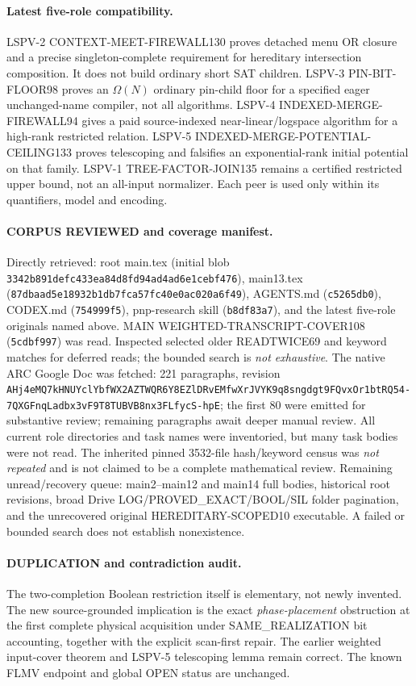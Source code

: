 \documentclass[11pt]{article}
\begin{document}
\paragraph{Latest five-role compatibility.}
LSPV-2 CONTEXT-MEET-FIREWALL130 proves
detached menu OR closure and a precise
singleton-complete requirement for hereditary
intersection composition. It does not
build ordinary short SAT children.
LSPV-3 PIN-BIT-FLOOR98 proves
an $\Omega(N)$ ordinary pin-child floor
for a specified eager unchanged-name compiler,
not all algorithms. LSPV-4
INDEXED-MERGE-FIREWALL94 gives a
paid source-indexed near-linear/logspace
algorithm for a high-rank restricted relation.
LSPV-5 INDEXED-MERGE-POTENTIAL-CEILING133
proves telescoping and falsifies an
exponential-rank initial potential on that
family. LSPV-1 TREE-FACTOR-JOIN135
remains a certified restricted upper bound,
not an all-input normalizer.
Each peer is used only within its
quantifiers, model and encoding.

\paragraph{CORPUS REVIEWED and coverage manifest.}
Directly retrieved: root main.tex
(initial blob \texttt{3342b891defc433ea84d8fd94ad4ad6e1cebf476}),
main13.tex (\texttt{87dbaad5e18932b1db7fca57fc40e0ac020a6f49}),
AGENTS.md (\texttt{c5265db0}),
CODEX.md (\texttt{754999f5}),
pnp-research skill (\texttt{b8df83a7}),
and the latest five-role originals named above.
MAIN WEIGHTED-TRANSCRIPT-COVER108
(\texttt{5cdbf997}) was read.
Inspected selected older READTWICE69 and
keyword matches for deferred reads;
the bounded search is \emph{not exhaustive}.
The native ARC Google Doc was fetched:
221 paragraphs, revision
\texttt{AHj4eMQ7kHNUYclYbfWX2AZTWQR6Y8EZlDRvEMfwXrJVYK9q8sngdgt9FQvxOr1btRQ54-7QXGFnqLadbx3vF9T8TUBVB8nx3FLfycS-hpE};
the first 80 were emitted for substantive
review; remaining paragraphs await
deeper manual review. All current role
directories and task names were inventoried,
but many task bodies were not read.
The inherited pinned 3532-file
hash/keyword census was \emph{not repeated}
and is not claimed to be a complete
mathematical review.
Remaining unread/recovery queue:
main2--main12 and main14 full bodies,
historical root revisions, broad Drive
LOG/PROVED\_EXACT/BOOL/SIL folder
pagination, and the unrecovered original
HEREDITARY-SCOPED10 executable.
A failed or bounded search does not
establish nonexistence.

\paragraph{DUPLICATION and contradiction audit.}
The two-completion Boolean restriction
itself is elementary, not newly invented.
The new source-grounded implication
is the exact \emph{phase-placement}
obstruction at the first complete physical
acquisition under SAME\_REALIZATION
bit accounting, together with the
explicit scan-first repair.
The earlier weighted input-cover theorem
and LSPV-5 telescoping lemma remain correct.
The known FLMV endpoint and global
OPEN status are unchanged.
\end{document}
